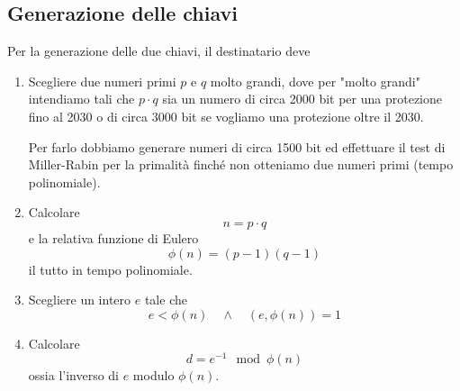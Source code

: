 \subsection{Generazione delle chiavi}
Per la generazione delle due chiavi, il destinatario deve
\begin{enumerate}
	\item Scegliere due numeri primi $p$ e $q$ molto grandi, dove per "molto grandi" intendiamo tali che $p \cdot q$
	      sia un numero di circa 2000 bit per una protezione fino al 2030 o di circa 3000 bit se vogliamo una
	      protezione oltre il 2030.

	      Per farlo dobbiamo generare numeri di circa 1500 bit ed effettuare il test di Miller-Rabin per la
	      primalit\`a finch\'e non otteniamo due numeri primi (tempo polinomiale).
	\item Calcolare
	      \[ n = p \cdot q \]
	      e la relativa funzione di Eulero
	      \[ \phi(n) = (p - 1)(q - 1) \]
	      il tutto in tempo polinomiale.
	\item Scegliere un intero $e$ tale che
	      \[ e < \phi(n) \quad \wedge \quad (e, \phi(n)) = 1 \]
	\item Calcolare
	      \[ d = e^{-1} \mod{\phi(n)} \]
	      ossia l'inverso di $e$ modulo $\phi(n)$.
\end{enumerate}